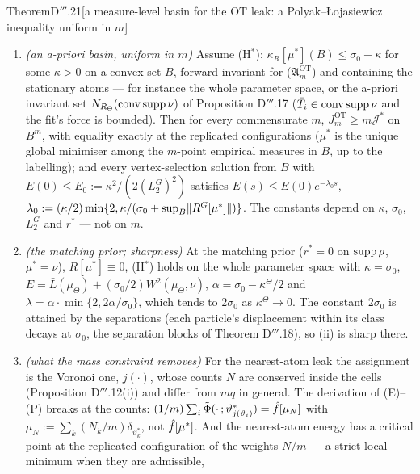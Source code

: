 \begin{thm}{Theorem}{D$'''$.21}[a measure-level basin for the OT leak: a Polyak--{\L}ojasiewicz inequality uniform
in $m$]
\begin{enumerate}[label=\textup{(\roman*)}]
\[    \]
    with $\lambda(\sigma)$ computed at $\Theta(\sigma)$ with its plan ($\lambda_+ := 0$ where $\alpha\le0$); where
    $\kappa^* < \sigma_0$, moreover $W^2(\mu_{\Theta(s)},\mu^*)\le D_{\pi(s)}\le2E(s)/(\sigma_0 - \kappa^*)$ and
    $\norm{\fhat_{\Theta(s)} - \fhat[\mu^*]}^2\le2E(s)$.
  \item \emph{(an a-priori basin, uniform in $m$)} Assume \textup{(H$^*$)}: $\kappa_R[\mu^*](B)\le\sigma_0 - \kappa$
    for some $\kappa > 0$ on a convex set $B$, forward-invariant for \textup{($\mathfrak{A}_m^{\mathrm{OT}}$)} and
    containing the stationary atoms --- for instance the whole parameter space, or the a-priori invariant set
    $N_{R_\Theta}(\operatorname{conv}\operatorname{supp}\nu)$ of Proposition D$'''$.17 ($\bar T_i\in\operatorname{conv}\operatorname{supp}\nu$
    and the fit's force is bounded). Then for every commensurate $m$, $J_m^{\mathrm{OT}}\ge m\mathcal{J}^*$ on
    $B^m$, with equality exactly at the replicated configurations ($\mu^*$ is the unique global minimiser among the
    $m$-point empirical measures in $B$, up to the labelling); and every vertex-selection solution from $B$ with
    $E(0)\le E_0 := \kappa^2/(2(L_2^G)^2)$ satisfies $E(s)\le E(0)e^{-\lambda_0s}$,
    $\lambda_0 := (\kappa/2)\min\{2,\kappa/(\sigma_0 + \sup_B\lVert R^G[\mu^*]\rVert)\}$. The constants depend on
    $\kappa$, $\sigma_0$, $L_2^G$ and $r^*$ --- not on $m$.
  \item \emph{(the matching prior; sharpness)} At the matching prior ($r^* = 0$ on $\operatorname{supp}\rho$, $\mu^* = \nu$),
    $R[\mu^*]\equiv0$, \textup{(H$^*$)} holds on the whole parameter space with $\kappa = \sigma_0$,
    $E = \bar L(\mu_\Theta) + (\sigma_0/2)W^2(\mu_\Theta,\nu)$, $\alpha = \sigma_0 - \kappa^\Theta/2$ and
    $\lambda = \alpha\cdot\min\{2, 2\alpha/\sigma_0\}$, which tends to $2\sigma_0$ as $\kappa^\Theta\to0$. The
    constant $2\sigma_0$ is attained by the separations (each particle's displacement within its class decays at
    $\sigma_0$, the separation blocks of Theorem D$'''$.18), so (ii) is sharp there.
  \item \emph{(what the mass constraint removes)} For the nearest-atom leak the assignment is the Voronoi one,
    $j(\cdot)$, whose counts $N$ are conserved inside the cells (Proposition D$'''$.12(i)) and differ from $mq$ in
    general. The derivation of \textup{(E)}--\textup{(P)} breaks at the counts:
    $(1/m)\sum_i\tilde\Phi(\cdot\,;\vartheta^*_{j(\vartheta_i)}) = \hat f[\mu_N]$ with
    $\mu_N := \sum_k(N_k/m)\delta_{\vartheta^*_k}$, not $\hat f[\mu^*]$. And the nearest-atom energy has a critical
    point at the replicated configuration of the weights $N/m$ --- a strict local minimum when they are admissible,

\end{enumerate}
\end{thm}
